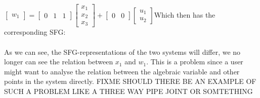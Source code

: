 \newline
$\left[ \begin{array}{c} w_1  \end{array} \right]
=  \begin{bmatrix} 0 & 1 & 1\end{bmatrix} \left[ \begin{array}{c} x_1 \\ x_2 \\ x_3 \end{array} \right] + \begin{bmatrix} 0 & 0 \end{bmatrix}  \left[ \begin{array}{c} u_1 \\ u_2 \end{array} \right]$\newline Which then has the corresponding SFG:\\\newline
\setlength\fboxsep{0pt}
\setlength\fboxrule{0.5pt}
\\\newline
As we can see, the SFG-representations of the two systems will differ, we no longer can see the relation between $x_1$ and $w_1$. This is a problem since a user might want to analyse the relation between the algebraic variable and other points in the system directly.
FIXME SHOULD THERE BE AN EXAMPLE OF SUCH A PROBLEM LIKE A THREE WAY PIPE JOINT OR SOMTETHING
%
%
%
